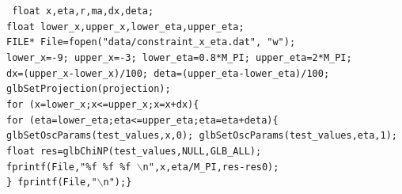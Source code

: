 \documentclass[a4paper,11pt]{article}
\begin{document}
\texttt{     float x,eta,r,ma,dx,deta;\\
     float lower\_x,upper\_x,lower\_eta,upper\_eta;\\
     FILE* File=fopen("data/constraint\_x\_eta.dat", "w");\\
    lower\_x=-9; upper\_x=-3; lower\_eta=0.8*M\_PI; upper\_eta=2*M\_PI;\\
    dx=(upper\_x-lower\_x)/100; deta=(upper\_eta-lower\_eta)/100;\\
        glbSetProjection(projection);\\
   for (x=lower\_x;x<=upper\_x;x=x+dx)\{ \\
    for (eta=lower\_eta;eta<=upper\_eta;eta=eta+deta)\{\\
     glbSetOscParams(test\_values,x,0); glbSetOscParams(test\_values,eta,1);\\
        float res=glbChiNP(test\_values,NULL,GLB\_ALL);\\
            fprintf(File,"\%f \%f  \%f $\backslash$n",x,eta/M\_PI,res-res0);\\
                     \} fprintf(File,"$\backslash$n");\}\\
}
\end{document}

